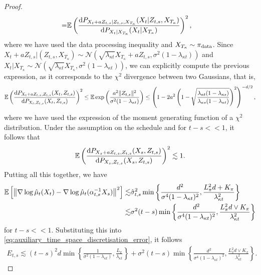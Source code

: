 \begin{proof}
\begin{align*}
    =& \mathbb{E}\left(\frac{\mathrm{d} P_{X_t + a Z_{t,s}| Z_{t,s}, X_{T_{\kappa}}}(X_t| Z_{t,s}, X_{T_{\kappa}})}{\mathrm{d} P_{X_t |  X_{T_{\kappa}}}(X_t|  X_{T_{\kappa}})}\right)^2,
\end{align*}
where we have used the data processing inequality and $X_{T_{\kappa}}\sim \operatorname*{\pi_{\text{data}}}$. Since $X_t + a Z_{t,s}|(Z_{t,s}, X_{T_{\kappa}})\sim \mathcal{N}(\sqrt{\lambda_{\kappa t}} X_{T_{\kappa}}+aZ_{t,s}, \sigma^2(1-\lambda_{\kappa t}))$ and $X_t|X_{T_{\kappa}}\sim\mathcal{N}(\sqrt{\lambda_{\kappa t}}X_{T_\kappa}, \sigma^2(1-\lambda_{\kappa t}))$, we can explicitly compute the previous expression, as it corresponds to the $\chi^2$ divergence between two Gaussians, that is,
\begin{align*}
    \mathbb{E}\left(\frac{\mathrm{d} P_{X_t + a Z_{t,s}, Z_{t,s}}(X_t, Z_{t,s})}{\mathrm{d} P_{X_t, Z_{t,s}}(X_t, Z_{t,s})}\right)^2\leq \mathbb{E}\exp \left(\frac{a^2\Vert Z_{t,s}\Vert^2}{\sigma^2(1-\lambda_{\kappa t})}\right)\leq \left(1-2a^2\left(1-\sqrt{\frac{\lambda_{\kappa t}(1-\lambda_{\kappa s})}{\lambda_{\kappa s}(1-\lambda_{\kappa t})}}\right)^2\right)^{-d/2},
\end{align*}
where we have used the expression of the moment generating function of a $\chi^2$ distribution. Under the assumption on the schedule and for $t-s<<1$, it follows that 
\begin{equation*}
    \mathbb{E}\left(\frac{\mathrm{d} P_{X_s + a Z_{t,s}, Z_{t,s}}(X_s, Z_{t,s})}{\mathrm{d} P_{X_s, Z_{t,s}}(X_s, Z_{t,s})}\right)^2\lesssim 1.
\end{equation*}
Putting all this together, we have
\begin{align*}
    \mathbb{E}\left[\left\Vert \nabla\log \hat{\mu}_t(X_t) - \nabla\log \hat{\mu}_t(\alpha_{t, s}^{-1}X_s)\right\Vert^2\right] \lesssim & \Hat{\sigma}_{t,s}^2 \min \left\{\frac{d^2}{\sigma^4(1-\lambda_{\kappa t})^2}, \frac{L_\pi^2 d + K_\pi}{\lambda_{\kappa t}^2}\right\}\\
    \lesssim &\sigma^2 (t-s) \min \left\{\frac{d^2}{\sigma^4(1-\lambda_{\kappa t})^2}, \frac{L_\pi^2 d\vee K_\pi}{\lambda_{\kappa t}^2}\right\}
\end{align*}
for $t-s<<1$. Substituting this into \eqref{eq:auxiliary_time_space_discretisation_error}, it follows
\begin{align*}
    E_{t,s}\lesssim (t-s)^2d\min\left\{\frac{1}{\sigma^2(1-\lambda_{\kappa t})}, \frac{L_\pi}{\lambda_{\kappa t}}\right\} + \sigma^2 (t-s) \min \left\{\frac{d^2}{\sigma^4(1-\lambda_{\kappa t})^2}, \frac{L_\pi^2 d \vee K_\pi}{\lambda_{\kappa t}^2}\right\}.
\end{align*}

\end{proof}
